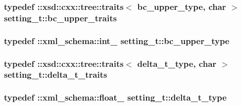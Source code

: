 \subsubsection[{\texorpdfstring{bc\+\_\+upper\+\_\+traits}{bc_upper_traits}}]{\setlength{\rightskip}{0pt plus 5cm}typedef \+::xsd\+::cxx\+::tree\+::traits$<$ {\bf bc\+\_\+upper\+\_\+type}, char $>$ {\bf setting\+\_\+t\+::bc\+\_\+upper\+\_\+traits}}\hypertarget{classsetting__t_add475d3af08f63aab575ec9a5b2ef6b6}{}\label{classsetting__t_add475d3af08f63aab575ec9a5b2ef6b6}
\subsubsection[{\texorpdfstring{bc\+\_\+upper\+\_\+type}{bc_upper_type}}]{\setlength{\rightskip}{0pt plus 5cm}typedef \+::{\bf xml\+\_\+schema\+::int\+\_\+} {\bf setting\+\_\+t\+::bc\+\_\+upper\+\_\+type}}\hypertarget{classsetting__t_abf5df957f10853c7b6a54a0073cd61fa}{}\label{classsetting__t_abf5df957f10853c7b6a54a0073cd61fa}
\subsubsection[{\texorpdfstring{delta\+\_\+t\+\_\+traits}{delta_t_traits}}]{\setlength{\rightskip}{0pt plus 5cm}typedef \+::xsd\+::cxx\+::tree\+::traits$<$ {\bf delta\+\_\+t\+\_\+type}, char $>$ {\bf setting\+\_\+t\+::delta\+\_\+t\+\_\+traits}}\hypertarget{classsetting__t_a16a46f4b3724acbc577a9a89691709dd}{}\label{classsetting__t_a16a46f4b3724acbc577a9a89691709dd}
\subsubsection[{\texorpdfstring{delta\+\_\+t\+\_\+type}{delta_t_type}}]{\setlength{\rightskip}{0pt plus 5cm}typedef \+::{\bf xml\+\_\+schema\+::float\+\_\+} {\bf setting\+\_\+t\+::delta\+\_\+t\+\_\+type}}\hypertarget{classsetting__t_ad2336c5ecdc0977272ba8126243d7977}{}\label{classsetting__t_ad2336c5ecdc0977272ba8126243d7977}
